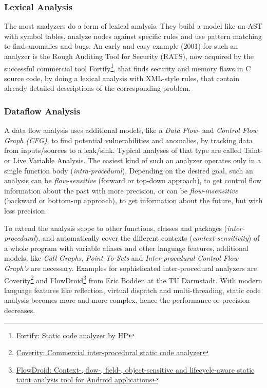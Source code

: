 \documentclass[conference]{IEEEtran}
\begin{document}
\subsubsection{Lexical Analysis}
\label{subsec:lex_analysis}
The most analyzers do a form of lexical analysis.
They build a model like an AST with symbol tables, analyze nodes against specific rules and use pattern matching to find anomalies and bugs.
An early and easy example (2001) for such an analyzer is the Rough Auditing Tool for Security (RATS)\cite{Static_code_analysis_book_Chess:2007}, now acquired by the successful commercial tool Fortify\footnote{\href{http://www8.hp.com/de/de/software-solutions/application-security/}{Fortify: Static code analyzer by HP}}, that finds security and memory flaws in C source code, by doing a lexical analysis with XML-style rules, that contain already detailed descriptions of the corresponding problem.


\subsubsection{Dataflow Analysis}
\label{subsec:dataflow_analysis}
A data flow analysis uses additional models, like a \textit{Data Flow}- and \textit{Control Flow Graph (CFG)}, to find potential vulnerabilities and anomalies, by tracking data from inputs/sources to a leak/sink.
Typical analyses of that type are called Taint- or Live Variable Analysis.
The easiest kind of such an analyzer operates only in a single function body (\textit{intra-procedural}).
Depending on the desired goal, such an analysis can be \textit{flow-sensitive} (forward or top-down approach), to get control flow information about the past with more precision, or can be \textit{flow-insensitive} (backward or bottom-up approach), to get information about the future, but with less precision.


To extend the analysis scope to other functions, classes and packages (\textit{inter-procedural}), and automatically cover the different contexts (\textit{context-sensitivity}) of a whole program with variable aliases and other language features, additional models, like \textit{Call Graphs}, \textit{Point-To-Sets} and \textit{Inter-procedural Control Flow Graph's} are necessary.
Examples for sophisticated inter-procedural analyzers are Coverity\footnote{\href{https://www.coverity.com}{Coverity: Commercial inter-procedural static code analyzer}} and FlowDroid\footnote{\href{http://sseblog.ec-spride.de/tools/flowdroid}{FlowDroid: Context-, flow-, field-, object-sensitive and lifecycle-aware static taint analysis tool for Android applications}} from Eric Bodden at the TU Darmstadt.
With modern language features like reflection, virtual dispatch and multi-threading, static code analysis becomes more and more complex, hence the performance or precision decreases.
\end{document}
